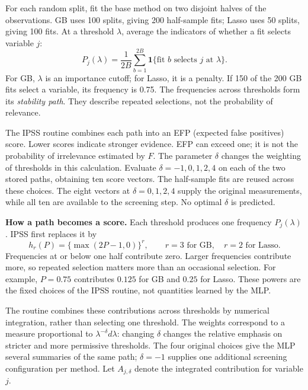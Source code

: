 \documentclass[10pt,letterpaper]{article}
\newcommand{\ind}{\mathbf{1}}
\begin{document}
For each random split, fit the base method on two disjoint halves
of the observations. GB uses 100 splits, giving 200 half-sample fits;
Lasso uses 50 splits, giving 100 fits. At a threshold $\lambda$,
average the indicators of whether a fit selects variable $j$:
\[
 P_j(\lambda)=\frac{1}{2B}\sum_{b=1}^{2B}
 \ind\{\text{fit }b\text{ selects }j\text{ at }\lambda\}.
\]
For GB, $\lambda$ is an importance cutoff; for Lasso, it is a penalty.
If 150 of the 200 GB fits select a variable, its frequency is 0.75.
The frequencies across thresholds form its \emph{stability path}.
They describe repeated selections, not the probability of relevance.

The IPSS routine \cite{ipss,ipssgb} combines each path into an EFP
(expected false positives) score. Lower scores indicate stronger
evidence. EFP can exceed one; it is not the probability of irrelevance
estimated by $F$. The parameter $\delta$ changes the weighting of thresholds
in this calculation. Evaluate $\delta=-1,0,1,2,4$ on each of the two
stored paths, obtaining ten score vectors. The half-sample fits are reused
across these choices. The eight vectors at $\delta=0,1,2,4$ supply the
original measurements, while all ten are available to the screening step.
No optimal $\delta$ is predicted.

\textbf{How a path becomes a score.} Each threshold produces one
frequency $P_j(\lambda)$. IPSS first replaces it by
\[
 h_r(P)=\{\max(2P-1,0)\}^{r},\qquad
 r=3\text{ for GB},\quad r=2\text{ for Lasso}.
\]
Frequencies at or below one half contribute zero. Larger frequencies
contribute more, so repeated selection matters more than an occasional
selection. For example, $P=0.75$ contributes $0.125$ for GB and $0.25$
for Lasso. These powers are the fixed choices of the IPSS routine, not
quantities learned by the MLP.

The routine combines these contributions across thresholds by numerical
integration, rather than selecting one threshold. The weights correspond
to a measure proportional to $\lambda^{-\delta}d\lambda$: changing $\delta$
changes the relative emphasis on stricter and more permissive thresholds.
The four original choices give the MLP several summaries of the same path;
$\delta=-1$ supplies one additional screening configuration per method.
Let $A_{j,\delta}$ denote the integrated contribution for variable $j$.
\end{document}
